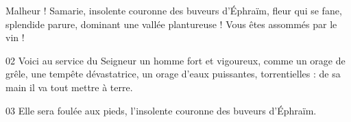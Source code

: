 Malheur ! Samarie, insolente couronne des buveurs d’Éphraïm, fleur qui se fane, splendide parure, dominant une vallée plantureuse ! Vous êtes assommés par le vin !

02 Voici au service du Seigneur un homme fort et vigoureux, comme un orage de grêle, une tempête dévastatrice, un orage d’eaux puissantes, torrentielles : de sa main il va tout mettre à terre.

03 Elle sera foulée aux pieds, l’insolente couronne des buveurs d’Éphraïm.



